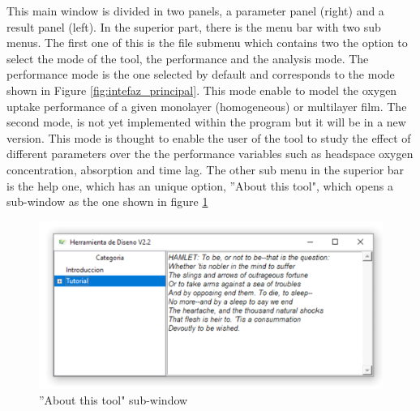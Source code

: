 \begin{refsection}
This main window is divided in two panels, a parameter panel (right) and a result panel (left). In the superior part, there is the menu bar with two sub menus. The first one of this is the file submenu which contains two the option to select the mode of the tool, the performance and the analysis mode. The performance mode is the one selected by default and corresponds to the mode shown in Figure \ref{fig:intefaz_principal}. This mode enable to model the oxygen uptake performance of a given monolayer (homogeneous) or multilayer film. The second mode, is not yet implemented within the program but it will be in a new version. This mode is thought to enable the user of the tool to study the effect of different parameters over the the performance variables such as headspace oxygen concentration, absorption and time lag. The other sub menu in the superior bar is the help one, which has an unique option, ''About this tool", which opens a sub-window as the one shown in figure \ref{fig:help_window}
 \begin{figure}[H]
     \centering
     \includegraphics[width=0.8\linewidth]{Documento_Latex/Imagenes/menu_ayuda.png}
     \caption{''About this tool" sub-window}
     \label{fig:help_window}
 \end{figure}

\end{refsection}
